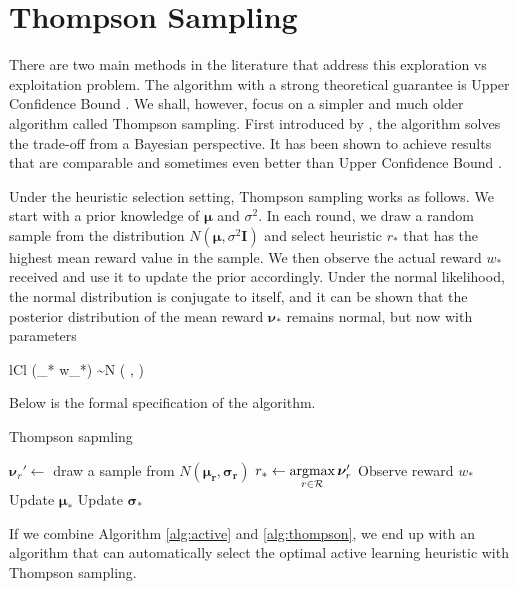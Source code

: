 \section{Thompson Sampling}
\label{sec:thompson}

There are two main methods in the literature that address this exploration vs exploitation 
problem. The algorithm with a strong theoretical guarantee is Upper Confidence Bound
\cite{auer02}. We shall, however, focus on a simpler and much older algorithm called Thompson sampling.
First introduced by , the algorithm solves the trade-off from
a Bayesian perspective. It has been shown to achieve results
that are comparable and sometimes even better than Upper Confidence Bound \cite{chapelle11}.

Under the heuristic selection setting, Thompson sampling works as follows.
We start with a prior knowledge of $\bm{\mu}$ and $\sigma^2$. In each
round, we draw a random sample from the distribution $N(\bm{\mu}, \sigma^2 \bm{I})$
and select heuristic $r_*$ that has the highest mean reward value in the sample. We then 
observe the actual reward $w_{*}$ received and use it to update the prior accordingly.
Under the normal likelihood, the normal distribution is conjugate to itself, and it can be
shown that the posterior distribution of the mean reward $\bm{\nu}_{*}$
remains normal, but now with parameters
	\begin{IEEEeqnarray*}{lCl}
		(\bm{\nu}_{*} \mid w_{*}) \sim N \left(
		,
		\frac{\bm{\sigma}_* \bm{\tau}_*}{\bm{\tau}_* + \bm{\sigma}_*}
		\right)
	\end{IEEEeqnarray*}
Below is the formal specification of the algorithm.

\begin{algorithm}[h]
	\caption{Thompson sapmling}
	\label{alg:thompson}
	\begin{algorithmic}[1]
		\State $\bm{\nu}_r' \leftarrow$ draw a sample from $N(\bm{\mu_r}, \bm{\sigma_r})$
		\Endforeach
		\State $r_* \leftarrow \argmax_{r \in \R}\bm{\nu}_r'$
		\State Observe reward $w_{*}$
		\State Update $\bm{\mu}_{*}$
		\State Update $\bm{\sigma}_{*}$
		\Endforeach
		\EndProcedure
	\end{algorithmic}
\end{algorithm}

If we combine Algorithm \ref{alg:active} and \ref{alg:thompson}, we end up with
an algorithm that can automatically select the optimal active learning heuristic
with Thompson sampling.

